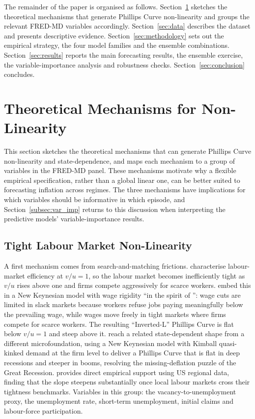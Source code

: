 \documentclass[12pt,a4paper]{article}
\begin{document}
The remainder of the paper is organised as follows. Section~\ref{sec:theory} sketches the theoretical mechanisms that generate Phillips Curve non-linearity and groups the relevant FRED-MD variables accordingly. Section~\ref{sec:data} describes the dataset and presents descriptive evidence. Section~\ref{sec:methodology} sets out the empirical strategy, the four model families and the ensemble combinations. Section~\ref{sec:results} reports the main forecasting results, the ensemble exercise, the variable-importance analysis and robustness checks. Section~\ref{sec:conclusion} concludes.

\FloatBarrier
\section{Theoretical Mechanisms for Non-Linearity}
\label{sec:theory}

This section sketches the theoretical mechanisms that can generate Phillips Curve non-linearity and state-dependence, and maps each mechanism to a group of variables in the FRED-MD panel. These mechanisms motivate why a flexible empirical specification, rather than a global linear one, can be better suited to forecasting inflation across regimes. The three mechanisms have implications for which variables should be informative in which episode, and Section~\ref{subsec:var_imp} returns to this discussion when interpreting the predictive models' variable-importance results.

\subsection{Tight Labour Market Non-Linearity}
\label{subsec:theory_labor}

A first mechanism comes from search-and-matching frictions. \citet{michaillat2024} characterise labour-market efficiency at $v/u = 1$, so the labour market becomes inefficiently tight as $v/u$ rises above one and firms compete aggressively for scarce workers. \citet{benigno2023} embed this in a New Keynesian model with wage rigidity ``in the spirit of \citet{phillips1958}'': wage cuts are limited in slack markets because workers refuse jobs paying meaningfully below the prevailing wage, while wages move freely in tight markets where firms compete for scarce workers. The resulting ``Inverted-L'' Phillips Curve is flat below $v/u = 1$ and steep above it. \citet{harding2022} reach a related state-dependent shape from a different microfoundation, using a New Keynesian model with Kimball quasi-kinked demand at the firm level to deliver a Phillips Curve that is flat in deep recessions and steeper in booms, resolving the missing-deflation puzzle of the Great Recession. \citet{gitti2024} provides direct empirical support using US regional data, finding that the slope steepens substantially once local labour markets cross their tightness benchmarks. Variables in this group: the vacancy-to-unemployment proxy, the unemployment rate, short-term unemployment, initial claims and labour-force participation.
\end{document}

